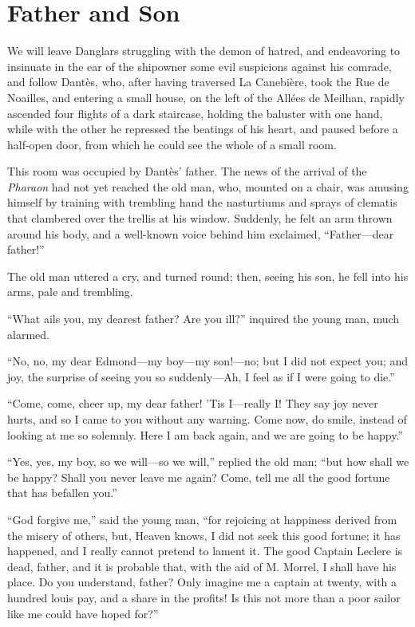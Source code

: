 \chapter{Father and Son}

We will leave Danglars struggling with the demon of hatred, and
endeavoring to insinuate in the ear of the shipowner some evil
suspicions against his comrade, and follow Dantès, who, after having
traversed La Canebière, took the Rue de Noailles, and entering a small
house, on the left of the Allées de Meilhan, rapidly ascended four
flights of a dark staircase, holding the baluster with one hand, while
with the other he repressed the beatings of his heart, and paused
before a half-open door, from which he could see the whole of a small
room.

This room was occupied by Dantès’ father. The news of the arrival of
the \textit{Pharaon} had not yet reached the old man, who, mounted on a chair,
was amusing himself by training with trembling hand the nasturtiums and
sprays of clematis that clambered over the trellis at his window.
Suddenly, he felt an arm thrown around his body, and a well-known voice
behind him exclaimed, “Father—dear father!”

The old man uttered a cry, and turned round; then, seeing his son, he
fell into his arms, pale and trembling.

“What ails you, my dearest father? Are you ill?” inquired the young
man, much alarmed.

“No, no, my dear Edmond—my boy—my son!—no; but I did not expect you;
and joy, the surprise of seeing you so suddenly—Ah, I feel as if I were
going to die.”

“Come, come, cheer up, my dear father! ’Tis I—really I! They say joy
never hurts, and so I came to you without any warning. Come now, do
smile, instead of looking at me so solemnly. Here I am back again, and
we are going to be happy.”

“Yes, yes, my boy, so we will—so we will,” replied the old man; “but
how shall we be happy? Shall you never leave me again? Come, tell me
all the good fortune that has befallen you.”

“God forgive me,” said the young man, “for rejoicing at happiness
derived from the misery of others, but, Heaven knows, I did not seek
this good fortune; it has happened, and I really cannot pretend to
lament it. The good Captain Leclere is dead, father, and it is probable
that, with the aid of M. Morrel, I shall have his place. Do you
understand, father? Only imagine me a captain at twenty, with a hundred
louis pay, and a share in the profits! Is this not more than a poor
sailor like me could have hoped for?”

